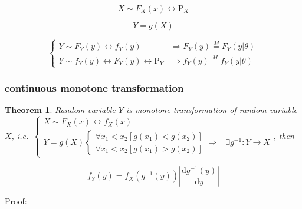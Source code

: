 \documentclass[
]{book}
\newtheorem{theorem}{Theorem}[chapter]
\theoremstyle{definition}
\theoremstyle{definition}
\theoremstyle{definition}
\theoremstyle{definition}
\theoremstyle{remark}
\begin{document}
\[
X\sim F_{{\scriptscriptstyle X}}\left(x\right)\leftrightarrow\mathrm{P}_{{\scriptscriptstyle X}}
\]

\[
Y=g\left(X\right)
\]

\[
\begin{cases}
Y\sim F_{{\scriptscriptstyle Y}}\left(y\right)\leftrightarrow f_{{\scriptscriptstyle Y}}\left(y\right) & \Rightarrow F_{{\scriptscriptstyle Y}}\left(y\right)\overset{M}{=}F_{{\scriptscriptstyle Y}}\left(y|\theta\right)\\
Y\sim f_{{\scriptscriptstyle Y}}\left(y\right)\leftrightarrow F_{{\scriptscriptstyle Y}}\left(y\right)\leftrightarrow\mathrm{P}_{{\scriptscriptstyle Y}} & \Rightarrow f_{{\scriptscriptstyle Y}}\left(y\right)\overset{M}{=}f_{{\scriptscriptstyle Y}}\left(y|\theta\right)
\end{cases}
\]

\subsubsection{continuous monotone transformation}\label{continuous-monotone-transformation}

\begin{theorem}
\protect\hypertarget{thm:unnamed-chunk-10}{}\label{thm:unnamed-chunk-10}Random variable \(Y\) is monotone transformation of random variable \(X\), i.e.~\(\begin{cases}
X\sim F_{{\scriptscriptstyle X}}\left(x\right)\leftrightarrow f_{{\scriptscriptstyle X}}\left(x\right)\\
Y=g\left(X\right)\begin{cases}
\forall x_{{\scriptscriptstyle 1}}<x_{{\scriptscriptstyle 2}}\left[g\left(x_{{\scriptscriptstyle 1}}\right)<g\left(x_{{\scriptscriptstyle 2}}\right)\right]\\
\forall x_{{\scriptscriptstyle 1}}<x_{{\scriptscriptstyle 2}}\left[g\left(x_{{\scriptscriptstyle 1}}\right)>g\left(x_{{\scriptscriptstyle 2}}\right)\right]
\end{cases}\Rightarrow & \exists g^{-1}:Y\rightarrow X
\end{cases}\), then
\end{theorem}

\[
f_{{\scriptscriptstyle Y}}\left(y\right)=f_{{\scriptscriptstyle X}}\left(g^{-1}\left(y\right)\right)\left|\dfrac{\mathrm{d}g^{-1}\left(y\right)}{\mathrm{d}y}\right|
\]

Proof:
\end{document}
